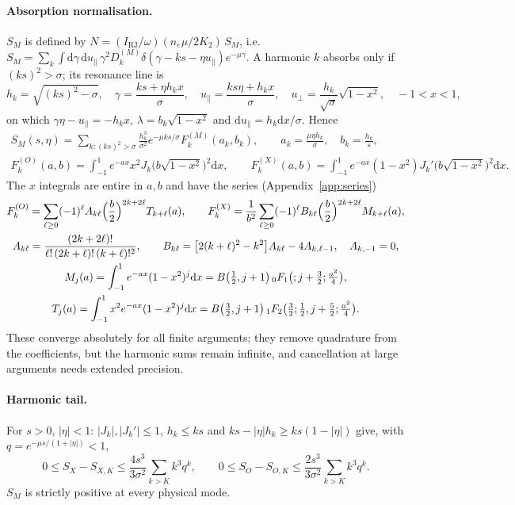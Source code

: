 \documentclass[11pt,a4paper]{article}
\numberwithin{equation}{section}
\newcommand{\dd}{\mathrm{d}}
\newcommand{\upar}{u_\parallel}
\newcommand{\uperp}{u_\perp}
\begin{document}
\paragraph{Absorption normalisation.} $S_M$ is defined by
$N=(I_{\mathrm{RJ}}/\omega)(n_e\mu/2K_2)\,S_M$, i.e.\
$S_M=\sum_k\int\dd\gamma\,\dd\upar\,\gamma^2D_k^{(M)}\delta(\gamma-ks-\eta\upar)e^{-\mu\gamma}$.
A harmonic $k$ absorbs only if $(ks)^2>\sigma$; its resonance line is
\begin{equation}
h_k=\sqrt{(ks)^2-\sigma},\quad \gamma=\frac{ks+\eta h_kx}{\sigma},\quad
\upar=\frac{ks\eta+h_kx}{\sigma},\quad \uperp=\frac{h_k}{\sqrt\sigma}\sqrt{1-x^2},\quad -1<x<1,
\end{equation}
on which $\gamma\eta-\upar=-h_kx$, $\lambda=b_k\sqrt{1-x^2}$ and
$\dd\upar=h_k\dd x/\sigma$. Hence
\begin{gather}
S_M(s,\eta)=\sum_{k:(ks)^2>\sigma}\frac{h_k^3}{\sigma^2}e^{-\mu ks/\sigma}F_k^{(M)}(a_k,b_k),\qquad
a_k=\frac{\mu\eta h_k}{\sigma},\quad b_k=\frac{h_k}{s},\label{eq:SM}\\
F_k^{(O)}(a,b)=\int_{-1}^{1}e^{-ax}x^2J_k\bigl(b\sqrt{1-x^2}\bigr)^2\dd x,\qquad
F_k^{(X)}(a,b)=\int_{-1}^{1}e^{-ax}(1-x^2)J_k'\bigl(b\sqrt{1-x^2}\bigr)^2\dd x .
\end{gather}
The $x$ integrals are entire in $a,b$ and have the series (Appendix~\ref{app:series})
\begin{gather}
F_k^{(O)}=\sum_{\ell\ge0}(-1)^\ell A_{k\ell}\Bigl(\frac b2\Bigr)^{2k+2\ell}T_{k+\ell}(a),\qquad
F_k^{(X)}=\frac1{b^2}\sum_{\ell\ge0}(-1)^\ell B_{k\ell}\Bigl(\frac b2\Bigr)^{2k+2\ell}M_{k+\ell}(a),\label{eq:Fseries}\\
A_{k\ell}=\frac{(2k+2\ell)!}{\ell!\,(2k+\ell)!\,(k+\ell)!^2},\qquad
B_{k\ell}=\bigl[2(k+\ell)^2-k^2\bigr]A_{k\ell}-4A_{k,\ell-1},\quad A_{k,-1}=0,\\
M_j(a)=\int_{-1}^1e^{-ax}(1-x^2)^j\dd x=B\bigl(\tfrac12,j+1\bigr)\,{}_0F_1\bigl(;j+\tfrac32;\tfrac{a^2}4\bigr),\\
T_j(a)=\int_{-1}^1x^2e^{-ax}(1-x^2)^j\dd x=B\bigl(\tfrac32,j+1\bigr)\,{}_1F_2\bigl(\tfrac32;\tfrac12,j+\tfrac52;\tfrac{a^2}4\bigr).
\end{gather}
These converge absolutely for all finite arguments; they remove quadrature from
the coefficients, but the harmonic sums remain infinite, and cancellation at
large arguments needs extended precision.

\paragraph{Harmonic tail.} For $s>0$, $|\eta|<1$: $|J_k|,|J_k'|\le1$, $h_k\le ks$ and
$ks-|\eta|h_k\ge ks(1-|\eta|)$ give, with $q=e^{-\mu s/(1+|\eta|)}<1$,
\begin{equation}
0\le S_X-S_{X,K}\le\frac{4s^3}{3\sigma^2}\sum_{k>K}k^3q^k,\qquad
0\le S_O-S_{O,K}\le\frac{2s^3}{3\sigma^2}\sum_{k>K}k^3q^k .
\end{equation}
$S_M$ is strictly positive at every physical mode.
\end{document}

